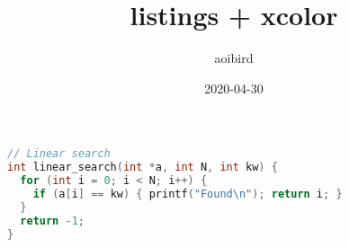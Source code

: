 \documentclass{article}
\title{listings + xcolor}
\author{aoibird}
\date{2020-04-30}
\begin{document}
\maketitle

\begin{lstlisting}[language=C++, caption=linear search]
// Linear search
int linear_search(int *a, int N, int kw) {
  for (int i = 0; i < N; i++) {
    if (a[i] == kw) { printf("Found\n"); return i; }
  }
  return -1;
}
\end{lstlisting}
\end{document}
